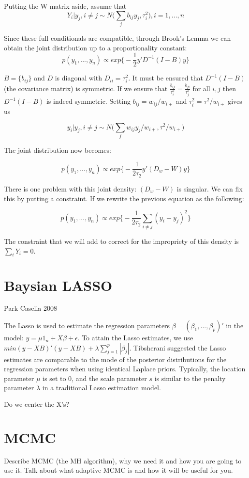 Putting the W matrix aside, assume that $$Y_i|y_{j},  i \neq j \sim N\bigg( \sum\limits_j   b_{ij} y_j, \tau_i^2 \bigg), i=1,...,n$$

Since these full conditionals are compatible, through Brook's Lemma we can obtain the joint distribution up to a proportionality constant: $$ p(y_1,...,y_n) \propto  exp \bigg\{   -\frac{1}{2}y' D^{-1}(I - B)y  \bigg\}   $$

$B = \{ b_{ij}\}$ and $D$ is diagonal with $D_{ii} = \tau_i^2$. It must be ensured that $D^{-1}(I - B)$ (the covariance matrix) is symmetric. If we ensure that $\frac{b_{ij}}{\tau_i^2} = \frac{b_{ji}}{\tau_j^2}$ for all $i,j$ then  $D^{-1}(I - B)$ is indeed symmetric. Setting $b_{ij} = w_{ij} / w_{i+} $ and $\tau_i^2 = \tau^2/w_{i+}$ gives us

  $$y_i | y_j, i \neq j \sim N\bigg(\sum_j w_{ij} y_j / w_{i+} , \tau^2/w_{i+}\bigg)$$

The joint distribution now becomes:

 $$ p(y_1,...,y_n) \propto  exp \bigg\{   -\frac{1}{2 \tau_2}y' (D_w-W) y  \bigg\}   $$

There is one problem with this joint density: $(D_w-W)$ is singular. We can fix this by putting a constraint. If we rewrite the previous equation  as the following: 

 $$ p(y_1,...,y_n) \propto  exp \bigg\{   -\frac{1}{2 \tau_2} \sum \limits_{i \neq j} (y_i-y_j)^2  \bigg\}   $$

The constraint that we will add to correct for the impropriety of this density is $\sum_i Y_i = 0$. 


\section{Baysian LASSO}
Park Casella 2008

The Lasso is used to estimate the regression parameters $\beta=(\beta_1,...,\beta_p)'$ in the model: $y= \mu 1_n + X\beta + \epsilon$. To attain the Lasso estimates, we use $min (y-XB)'(y-XB) + \lambda \sum \limits_{j=1}^p |\beta_j|$. Tibsherani suggested the Lasso estimates are comparable to the mode of the posterior distributions for the regression parameters when using identical Laplace priors. Typically, the location parameter $\mu$ is set to 0, and the scale parameter $s$ is similar to the penalty parameter $\lambda$ in a traditional Lasso estimation model. 

Do we center the X's?

\section{MCMC}
Describe MCMC (the MH algorithm), why we need it and how you are going to use it.  Talk about what adaptive MCMC is and how it will be useful for you.


